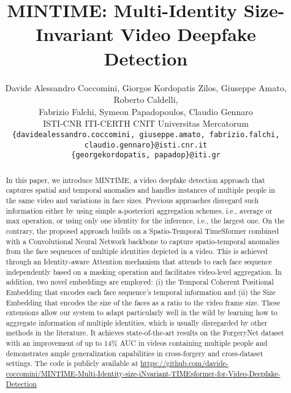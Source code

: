 \documentclass[10pt,twocolumn,letterpaper]{article}
\begin{document}
\title{MINTIME: Multi-Identity Size-Invariant Video Deepfake Detection}





\author{Davide Alessandro Coccomini, Giorgos Kordopatis Zilos, Giuseppe Amato, Roberto Caldelli, \\ Fabrizio Falchi, Symeon Papadopoulos, Claudio Gennaro \\
ISTI-CNR \quad ITI-CERTH \quad CNIT \quad Universitas Mercatorum \\
{\tt\small \{davidealessandro.coccomini, giuseppe.amato, fabrizio.falchi, claudio.gennaro\}@isti.cnr.it} \\
{\tt\small \{georgekordopatis, papadop\}@iti.gr} }
\maketitle
\begin{abstract}
In this paper, we introduce MINTIME, a video deepfake detection approach that captures spatial and temporal anomalies and handles instances of multiple people in the same video and variations in face sizes. Previous approaches disregard such information either by using simple a-posteriori aggregation schemes, i.e., average or max operation, or using only one identity for the inference, i.e., the largest one. On the contrary, the proposed approach builds on a Spatio-Temporal TimeSformer combined with a Convolutional Neural Network backbone to capture spatio-temporal anomalies from the face sequences of multiple identities depicted in a video. This is achieved through an Identity-aware Attention mechanism that attends to each face sequence independently based on a masking operation and facilitates video-level aggregation. In addition, two novel embeddings are employed: (i) the Temporal Coherent Positional Embedding that encodes each face sequence's temporal information and (ii) the Size Embedding that encodes the size of the faces as a ratio to the video frame size. These extensions allow our system to adapt particularly well in the wild by learning how to aggregate information of multiple identities, which is usually disregarded by other methods in the literature. It achieves state-of-the-art results on the ForgeryNet dataset with an improvement of up to 14\% AUC in videos containing multiple people and demonstrates ample generalization capabilities in cross-forgery and cross-dataset settings. The code is publicly available at \url{https://github.com/davide-coccomini/MINTIME-Multi-Identity-size-iNvariant-TIMEsformer-for-Video-Deepfake-Detection}
\end{abstract}
\end{document}
